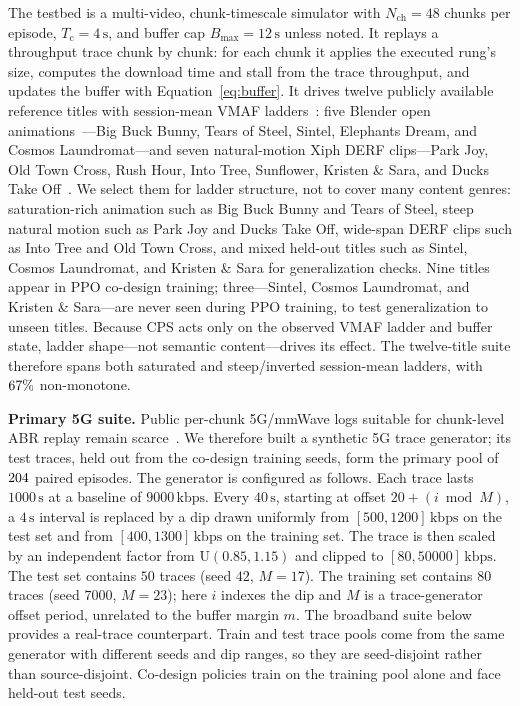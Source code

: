 The testbed is a multi-video, chunk-timescale simulator with \(N_{\mathrm{ch}}{=}48\) chunks per episode, \(T_{\mathrm{c}}{=}4\,\mathrm{s}\), and buffer cap \(B_{\max}{=}12\,\mathrm{s}\) unless noted. It replays a throughput trace chunk by chunk: for each chunk it applies the executed rung's size, computes the download time and stall from the trace throughput, and updates the buffer with Equation~\eqref{eq:buffer}. It drives twelve publicly available reference titles with session-mean VMAF ladders~\cite{li2016vmaf}: five Blender open animations~\cite{blenderfilms}---Big Buck Bunny, Tears of Steel, Sintel, Elephants Dream, and Cosmos Laundromat---and seven natural-motion Xiph DERF clips---Park Joy, Old Town Cross, Rush Hour, Into Tree, Sunflower, Kristen \& Sara, and Ducks Take Off~\cite{xiphderf}.
We select them for ladder structure, not to cover many content genres: saturation-rich animation such as Big Buck Bunny and Tears of Steel, steep natural motion such as Park Joy and Ducks Take Off, wide-span DERF clips such as Into Tree and Old Town Cross, and mixed held-out titles such as Sintel, Cosmos Laundromat, and Kristen \& Sara for generalization checks.
Nine titles appear in PPO co-design training; three---Sintel, Cosmos Laundromat, and Kristen \& Sara---are never seen during PPO training, to test generalization to unseen titles.
Because CPS acts only on the observed VMAF ladder and buffer state, ladder shape---not semantic content---drives its effect. The twelve-title suite therefore spans both saturated and steep/inverted session-mean ladders, with \(67\%\) non-monotone.

\textbf{Primary \mbox{5G} suite.} Public per-chunk \mbox{5G/mmWave} logs suitable for chunk-level ABR replay remain scarce~\cite{narayanan2021variegated,fezeu2024midband}. We therefore built a synthetic \mbox{5G} trace generator; its test traces, held out from the co-design training seeds, form the primary pool of \(204\) paired episodes. The generator is configured as follows.
Each trace lasts \(1000\,\mathrm{s}\) at a baseline of \(9000\,\mathrm{kbps}\). Every \(40\,\mathrm{s}\), starting at offset \(20+(i \bmod M)\), a \(4\,\mathrm{s}\) interval is replaced by a dip drawn uniformly from \([500,1200]\,\mathrm{kbps}\) on the test set and from \([400,1300]\,\mathrm{kbps}\) on the training set. The trace is then scaled by an independent factor from \(\mathrm{U}(0.85,1.15)\) and clipped to \([80,50000]\,\mathrm{kbps}\).
The test set contains \(50\) traces (seed \(42\), \(M{=}17\)). The training set contains \(80\) traces (seed \(7000\), \(M{=}23\)); here \(i\) indexes the dip and \(M\) is a trace-generator offset period, unrelated to the buffer margin \(m\).
The broadband suite below provides a real-trace counterpart.
Train and test trace pools come from the same generator with different seeds and dip ranges, so they are seed-disjoint rather than source-disjoint. Co-design policies train on the training pool alone and face held-out test seeds.

